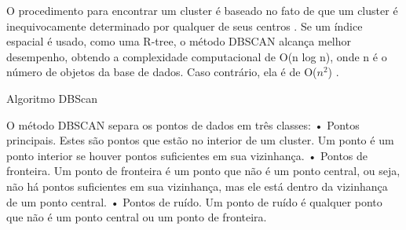 \begin{figure}[!h]
	\centering
\end{figure}

O procedimento para encontrar um cluster é baseado no fato de que um cluster é
inequivocamente determinado por qualquer de seus centros \cite{ESTER1998}. Se
um índice espacial é usado, como uma R-tree, o método DBSCAN alcança melhor
desempenho, obtendo a complexidade computacional de O(n log n), onde n é o número
de objetos da base de dados. Caso contrário, ela é de O(${n^2}$) \cite{Sheikholeslami1998}.

\begin{algorithm}[h!]
	\SetSpacedAlgorithm
	\caption{\label{alg:algoritmo_dbscan}Algoritmo DBScan}
\end{algorithm}


 O método DBSCAN separa os pontos de dados em três classes:
• Pontos principais. Estes são pontos que estão no interior de um cluster. Um ponto é um ponto interior se houver pontos suficientes em sua vizinhança.
• Pontos de fronteira. Um ponto de fronteira é um ponto que não é um ponto central, ou seja, não há pontos suficientes em sua vizinhança, mas ele está dentro da vizinhança de um ponto central.
• Pontos de ruído. Um ponto de ruído é qualquer ponto que não é um ponto central ou um ponto de fronteira.

